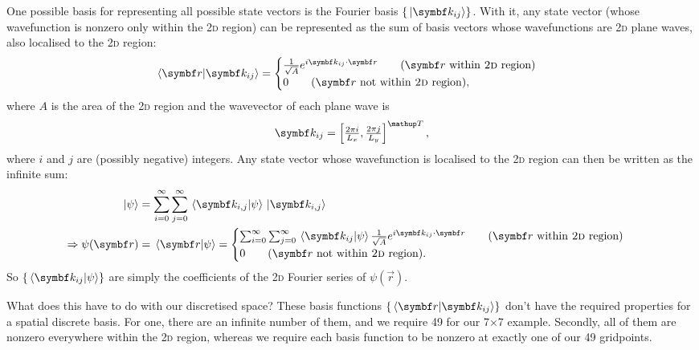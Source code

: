 One possible basis for representing all possible state vectors is the Fourier basis $\{\ket{\vec k_{ij}}\}$. With it, any state vector (whose wavefunction is nonzero only within the \textsc{2d} region) can be represented as the sum of basis vectors whose wavefunctions are \textsc{2d} plane waves, also localised to the 2\textsc{d} region:
\begin{align}\label{eq:spatial_plane_wave_basis}
\braket{\vec r}{\vec k_{ij}} = \begin{cases}
\frac 1 {\sqrt A} e^{i\vec k_{ij}\cdot\vec r}\qquad (\vec r\ \textrm{within \textsc{2d} region})\\
0\qquad(\vec r\ \textrm{not within \textsc{2d} region}),
\end{cases}
\end{align}
where $A$ is the area of the \textsc{2d} region and the wavevector of each plane wave is
\begin{align}
\vec k_{ij} = \left[ \tfrac {2\pi i}{L_x}, \tfrac {2\pi j}{L_y}\right]^\up{T},
\end{align}
where $i$ and $j$ are (possibly negative) integers. Any state vector whose wavefunction is localised to the \textsc{2d} region can then be written as the infinite sum:
\begin{align}
\ket\psi &= \sum_{i=0}^\infty\sum_{j=0}^\infty \braket{\vec k_{i,j}}\psi \ket{\vec k_{i,j}}\\
\Rightarrow \psi(\vec r) &= \braket{\vec r}{\psi} = \begin{cases}
\sum_{i=0}^\infty\sum_{j=0}^\infty \braket{\vec k_{ij}}\psi \frac 1 {\sqrt A} e^{i\vec k_{ij}\cdot\vec r}
\qquad (\vec r\ \textrm{within \textsc{2d} region})\\
0\qquad(\vec r\ \textrm{not within \textsc{2d} region}).
\end{cases}
\end{align}
So $\{\braket{\vec k_{ij}}\psi\}$ are simply the coefficients of the \textsc{2d} Fourier series of $\psi(\vec r)$.

What does this have to do with our discretised space? These basis functions $\{\braket{\vec r}{\vec k_{ij}}\}$ don't have the required properties for a spatial discrete basis. For one, there are an infinite number of them, and we require 49 for our 7$\times$7 example. Secondly, all of them are nonzero everywhere within the \textsc{2d} region, whereas we require each basis function to be nonzero at exactly one of our 49 gridpoints.


